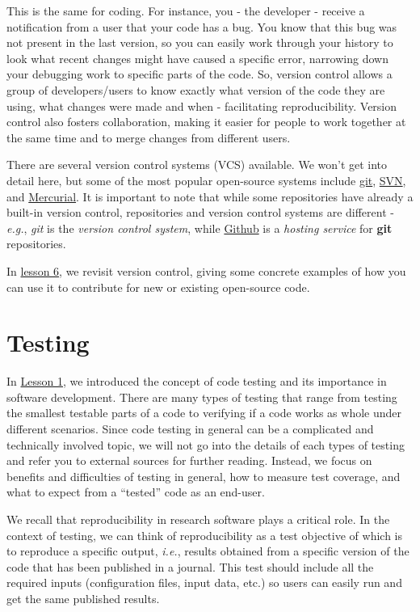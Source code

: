 \documentclass[
  letterpaper,
  DIV=11,
  numbers=noendperiod]{scrreport}
\begin{document}
This is the same for coding. For instance, you - the developer - receive
a notification from a user that your code has a bug. You know that this
bug was not present in the last version, so you can easily work through
your history to look what recent changes might have caused a specific
error, narrowing down your debugging work to specific parts of the code.
So, version control allows a group of developers/users to know exactly
what version of the code they are using, what changes were made and when
- facilitating reproducibility. Version control also fosters
collaboration, making it easier for people to work together at the same
time and to merge changes from different users.

There are several version control systems (VCS) available. We won't get
into detail here, but some of the most popular open-source systems
include \href{link}{git}, \href{link}{SVN}, and \href{link}{Mercurial}.
It is important to note that while some repositories have already a
built-in version control, repositories and version control systems are
different - \emph{e.g.}, \emph{git} is the \emph{version control
system}, while \href{https://github.com}{Github} is a \emph{hosting
service} for \textbf{git} repositories.

In \href{link}{lesson 6}, we revisit version control, giving some
concrete examples of how you can use it to contribute for new or
existing open-source code.

\hypertarget{testing}{%
\section{Testing}\label{testing}}

In \href{link}{Lesson 1}, we introduced the concept of code testing and
its importance in software development. There are many types of testing
that range from testing the smallest testable parts of a code to
verifying if a code works as whole under different scenarios. Since code
testing in general can be a complicated and technically involved topic,
we will not go into the details of each types of testing and refer you
to external sources for further reading. Instead, we focus on benefits
and difficulties of testing in general, how to measure test coverage,
and what to expect from a ``tested'' code as an end-user.

We recall that reproducibility in research software plays a critical
role. In the context of testing, we can think of reproducibility as a
test objective of which is to reproduce a specific output, \emph{i.e.},
results obtained from a specific version of the code that has been
published in a journal. This test should include all the required inputs
(configuration files, input data, etc.) so users can easily run and get
the same published results.
\end{document}
